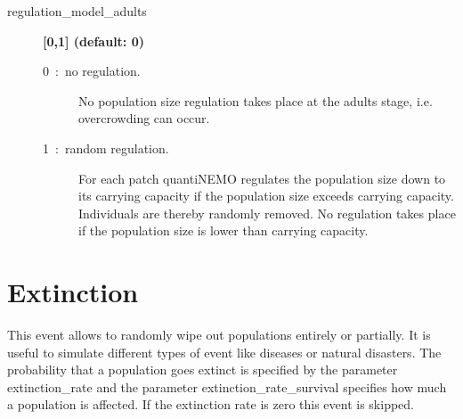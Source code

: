 \documentclass[letterpaper,12pt,oneside]{book}
\begin{document}
\begin{description}
\item[regulation\_model\_adults] \textbf{[0,1] (default: 0)}
\begin{description}
\item[0~:~no regulation.] No population size regulation takes place at the adults stage, i.e. overcrowding can occur.
\item[1~:~random regulation.] For each patch quantiNEMO regulates the population size down to its carrying capacity if the population size exceeds carrying capacity. Individuals are thereby randomly removed. No regulation takes place if the population size is lower than carrying capacity.
\end{description}
\end{description}

\section{Extinction}\label{8extinction}
This event allows to randomly wipe out populations entirely or partially. It is useful to simulate different types of event like diseases or natural disasters.   The probability that a population goes extinct is specified by the parameter \textsf{extinction\_rate} and the parameter \textsf{extinction\_rate\_survival} specifies how much a population is affected. If the extinction rate is zero this event is skipped.
\end{document}
